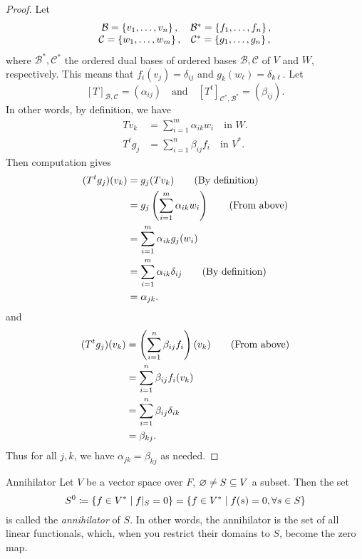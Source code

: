 \documentclass[class=article, crop=false]{standalone}
\begin{document}
  \begin{proof}
    Let
    \[\begin{array}{cc}\mathcal{B} = \left\{v_1,\dotsc,v_n\right\}, & \mathcal{B}^* = \left\{f_1,\dotsc,f_n\right\},\\ \mathcal{C} = \left\{w_1,\dotsc,w_m\right\}, & \mathcal{C}^* = \left\{g_1,\dotsc,g_n\right\},\end{array}\]
    where $\mathcal{B}^*,\mathcal{C^*}$ the ordered dual bases of ordered bases $\mathcal{B},\mathcal{C}$ of $V$ and $W$, respectively. This means that $f_i(v_j) = \delta_{ij}$ and $g_k(w_\ell) = \delta_{k\ell}$. Let
    \[
      [T]_{\mathcal{B},\mathcal{C}} = (\alpha_{ij}) \quad \text{and}\quad [T^t]_{\mathcal{C}^*,\mathcal{B}^*} = (\beta_{ij}).
    \]
    In other words, by definition, we have
    \begin{align*}
      Tv_k &= \sum_{i=1}^{m}\alpha_{ik}w_i \quad\text{in }W\tag{$k = 1,\dotsc,n$}. \\
      T^tg_j &= \sum_{i=1}^{n}\beta_{ij}f_i \quad\text{in }V^* \tag{$j = 1,\dotsc,m$}.
    \end{align*}
    Then computation gives
    \begin{align*}
      (T^tg_j)(v_k) &= g_j(Tv_k) \tag{By definition}\\
                    &= g_j \left( \sum_{i=1}^{m}\alpha_{ik}w_i \right) \tag{From above}\\
                    &= \sum_{i=1}^{m}\alpha_{ik}g_j(w_i) \\
                    &= \sum_{i=1}^{m}\alpha_{ik}\delta_{ij} \tag{By definition}\\
                    &= \alpha_{jk}.
    \end{align*}
    and
    \begin{align*}
      (T^tg_j)(v_k) &= \left( \sum_{i=1}^{n}\beta_{ij}f_i \right)(v_k) \tag{From above}\\
                    &= \sum_{i=1}^{n}\beta_{ij}f_i(v_k) \\
                    &= \sum_{i=1}^{n}\beta_{ij}\delta_{ik} \\
                    &= \beta_{kj}.
    \end{align*}
    Thus for all $j, k$, we have $\alpha_{jk} = \beta_{kj}$ as needed.
  \end{proof}
  \begin{definition}{Annihilator}
    Let $V$ be a vector space over $F$, $\varnothing\neq S\subseteq V$ a subset. Then the set
    \[
      S^0 \coloneqq \left\{f\in V^*\mid f|_S = 0\right\} = \left\{f\in V^*\mid f(s) = 0, \forall s\in S\right\}
    \]
    is called the \emph{annihilator} of $S$. In other words, the annihilator is the set of all linear functionals, which, when you restrict their domains to $S$, become the zero map.
  \end{definition}
\end{document}
